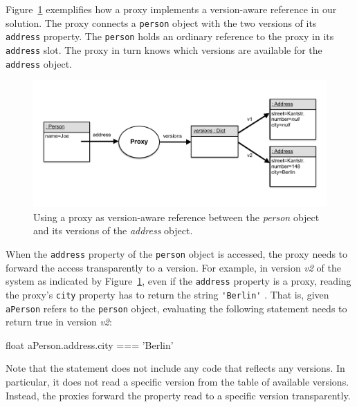 Figure~\ref{fig:ProxyBasedVersionAwareReference} exemplifies how a proxy implements a version-aware reference in our solution.
The proxy connects a \lstinline{person} object with the two versions of its \lstinline{address} property.
The \lstinline{person} holds an ordinary reference to the proxy in its \lstinline{address} slot.
The proxy in turn knows which versions are available for the \lstinline{address} object.

\begin{figure}[h]
    \centering
    \includegraphics[width=\textwidth]{figures/4_approach/7_proxyBasedVersionAwareReference.pdf}
    \caption{Using a proxy as version-aware reference between the \emph{person} object and its versions of the \emph{address} object.}
    \label{fig:ProxyBasedVersionAwareReference}
\end{figure}

When the \lstinline{address} property of the \lstinline{person} object is accessed, the proxy needs to forward the access transparently to a version.
For example, in version \emph{v2} of the system as indicated by Figure~\ref{fig:ProxyBasedVersionAwareReference}, even if the \lstinline{address} property is a proxy, reading the proxy's \lstinline{city} property has to return the string \lstinline{'Berlin'} .
That is, given \lstinline{aPerson} refers to the \lstinline{person} object, evaluating the following statement needs to return true in version \emph{v2}:

\begin{code}{}{float}
aPerson.address.city === 'Berlin'
\end{code}
\iffalse
\end{verbatim}\fi

Note that the statement does not include any code that reflects any versions.
In particular, it does not read a specific version from the table of available versions.
Instead, the proxies forward the property read to a specific version transparently.

